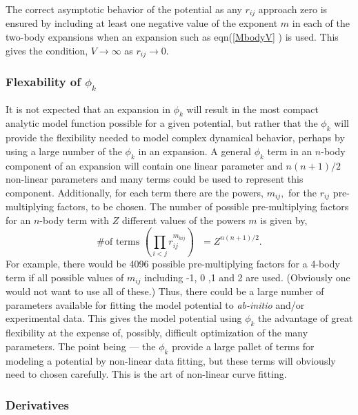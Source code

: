 The correct asymptotic behavior of the potential as any $r_{ij}$ approach
zero is ensured by including at least one negative value of the exponent $m$
in each of the two-body expansions when an expansion such as eqn(\ref{MbodyV}%
) is used. This gives the condition, $V\rightarrow \infty $ as $%
r_{ij}\rightarrow 0.$

\subsubsection{Flexability of $\phi _k$}

It is not expected that an expansion in $\phi _k$ will result in the most
compact analytic model function possible for a given potential, but rather
that the $\phi _k$ will provide the flexibility needed to model complex
dynamical behavior, perhaps by using a large number of the $\phi _k$ in an
expansion. A general $\phi _k$ term in an $n$-body component of an expansion
will contain one linear parameter and $n\left( n+1\right) /2$ non-linear
parameters and many terms could be used to represent this component.
Additionally, for each term there are the powers, $m_{ij},$ for the $r_{ij}$
pre-multiplying factors, to be chosen. The number of possible
pre-multiplying factors for an $n$-body term with $Z$ different values of
the powers $m$ is given by, 
\begin{equation}
\text{\# of terms }\left( \prod_{i<j}r_{ij}^{m_{kij}}\right) \text{ }%
=Z^{n\left( n+1\right) /2}.
\end{equation}
For example, there would be 4096 possible pre-multiplying factors for a
4-body term if all possible values of $m_{ij}$ including -1, 0 ,1 and 2 are
used. (Obviously one would not want to use all of these.) Thus, there could
be a large number of parameters available for fitting the model potential to 
{\em ab-initio} and/or experimental data. This gives the model potential
using $\phi _k$ the advantage of great flexibility at the expense of,
possibly, difficult optimization of the many parameters. The point being ---
the $\phi _k$ provide a large pallet of terms for modeling a potential by
non-linear data fitting, but these terms will obviously need to chosen
carefully. This is the art of non-linear curve fitting.

\subsubsection{Derivatives}

